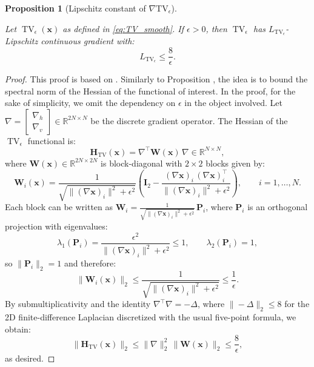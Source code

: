 \documentclass[letterpaper]{article}
\newtheorem{proposition}{Proposition}
\begin{document}
\begin{proposition}[Lipschitz constant of $\nabla \text{TV}_{\epsilon}$]
\label{prop:lip_F}

Let $\operatorname{TV}_{\epsilon}(\mathbf{x})$ as defined in \eqref{eq:TV_smooth}. If $\epsilon > 0$, then $\operatorname{TV}_{\epsilon}$ has $L_{\operatorname{TV}_{\epsilon}}$-Lipschitz continuous gradient with:
\begin{equation} \label{eq:L_ISM_TV}
L_{\operatorname{TV}_{\epsilon}} \leq  \frac{8}{\epsilon}.
\end{equation}
\end{proposition}

\begin{proof} This proof is based on \cite[Theorem 3.1]{chambolle2004algorithm}.
Similarly to Proposition , the idea is to bound the spectral norm of the Hessian of the functional of interest. In the proof, for the sake of simplicity, we omit the dependency on $\epsilon$ in the object involved. Let $\nabla = \begin{bmatrix}\nabla_h \\ \nabla_v\end{bmatrix} \in \mathbb{R}^{2N \times N}$ 
be the discrete gradient operator. The Hessian of  the $\operatorname{TV}_\epsilon$ functional is:
\begin{equation}    \mathbf{H}_{\operatorname{TV}}(\mathbf{x}) = \nabla^\top \mathbf{W}(\mathbf{x})\, \nabla 
    \in \mathbb{R}^{N \times N},
\end{equation}
where $\mathbf{W}(\mathbf{x}) \in \mathbb{R}^{2N \times 2N}$ is block-diagonal with 
$2 \times 2$ blocks given by:
\begin{equation}
    \mathbf{W}_i(\mathbf{x}) = \frac{1}{\sqrt{\|(\nabla \mathbf{x})_i\|^2 + \epsilon^2}}
    \left(\mathbf{I}_2 - \frac{(\nabla \mathbf{x})_i\,(\nabla \mathbf{x})_i^\top}
    {\|(\nabla \mathbf{x})_i\|^2 + \epsilon^2}\right), \qquad i = 1, \dots, N.
\end{equation}
Each block can be written as $\mathbf{W}_{i} = \frac{1}{\sqrt{\|(\nabla\mathbf{x})_i\|^2 
+ \epsilon^2}}\,\mathbf{P}_i$, where $\mathbf{P}_i$ is an orthogonal projection with 
eigenvalues:
\begin{equation}
    \lambda_1(\mathbf{P}_i) = \frac{\epsilon^2}{\|(\nabla \mathbf{x})_i\|^2 + \epsilon^2} 
    \leq 1, \qquad \lambda_2(\mathbf{P}_i) = 1,
\end{equation}
so $\|\mathbf{P}_i\|_2 = 1$ and therefore:
\begin{equation}
    \|\mathbf{W}_i(\mathbf{x})\|_2 \leq \frac{1}{\sqrt{\|(\nabla \mathbf{x})_i\|^2 
    + \epsilon^2}} \leq \frac{1}{\epsilon}.
\end{equation}
By submultiplicativity and the identity $\nabla^\top \nabla = -\Delta$, where 
$\|-\Delta\|_2 \leq 8$ for the  2D finite-difference Laplacian discretized with the usual five-point formula, we obtain:
\begin{equation}
    \|\mathbf{H}_{\text{TV}}(\mathbf{x})\|_2 \leq \|\nabla\|_2^2\,\|\mathbf{W}(\mathbf{x})\|_2 
    \leq \frac{8}{\epsilon}, 
\end{equation}
as desired.
\end{proof}
\end{document}
